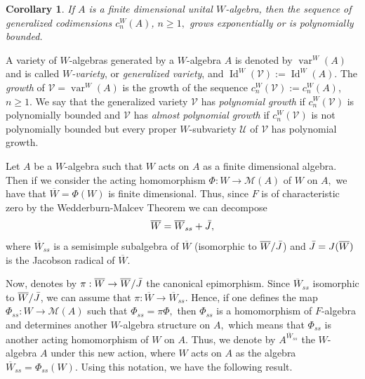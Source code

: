 \documentclass[reqno]{amsart}
\newtheorem{corollary}[theorem]{Corollary}
\theoremstyle{definition}
\numberwithin{equation}{section}
\numberwithin{theorem}{section}
\DeclareMathOperator{\V}{var}
\DeclareMathOperator{\I}{Id}
\newcommand{\M}{\mathcal{M}}
\begin{document}
\begin{corollary}
    If $A$ is a finite dimensional unital $W$-algebra, then the sequence of generalized codimensions $c^W_n(A)$, $n\geq 1,$ grows exponentially or is polynomially bounded.
\end{corollary}



    A variety of $W$-algebras generated by a $W$-algebra $A$ is denoted by $\V^W(A)$ and is called \emph{$W$-variety}, or \emph{generalized variety}, and $\I^W(\mathcal{V}):=\I^W(A)$. The \emph{growth} of $\mathcal{V}= \V^W(A)$ is the growth of the sequence $c_{n}^W(\mathcal{V}):=c_{n}^W(A)$, $n\geq 1$. We say that the generalized variety $\mathcal{V}$ has \emph{polynomial growth} if $c_{n}^W(\mathcal{V})$ is polynomially bounded and $\mathcal{V}$ has \emph{almost polynomial growth} if  $c_{n}^W(\mathcal{V})$ is not polynomially bounded but every proper $W$-subvariety $\mathcal{U}$ of $\mathcal{V}$ has polynomial growth.




   
    

\smallskip



Let $A$ be a $W$-algebra such that $W$ acts on $A$ as a finite dimensional algebra. Then if we consider the acting homomorphism $\Phi: W \to \M(A)$ of $W$ on $A,$ 
we have that $\overline{W}= \Phi(W)$ is finite dimensional. Thus, since $F$ is of characteristic zero
by the Wedderburn-Malcev Theorem we can decompose 
$$\overline{W}=\overline{W}_{ss}+\Bar{J},$$ 
where $\overline{W}_{ss}$ is a semisimple subalgebra of $\overline{W}$ (isomorphic to $\overline{W}/\Bar{J}$) and $\Bar{J}=J(\overline{W})$ is the Jacobson radical of $\overline{W}$. 



Now, denotes by $\pi:\overline{W} \rightarrow \overline{W}/\Bar{J}$ the canonical epimorphism. Since $\overline{W}_{ss}$ isomorphic to $\overline{W}/\Bar{J}$, we can assume that $\pi:\overline{W}\rightarrow \overline{W}_{ss}.$
Hence, if one defines the map $\Phi_{ss}: W \to \M(A)$ 
such that $\Phi_{ss}=\pi\Phi ,$ then $\Phi_{ss}$ is a homomorphism of $F$-algebra and determines another $W$-algebra structure on $A,$ which means that $\Phi_{ss}$ is another acting homomorphism of $W$ on $A.$ 
Thus, we denote by  $A^{\overline{W}_{ss}}$ the $W$-algebra $A$ under this new action, where $W$ acts on $A$ as the algebra $\overline{W}_{ss}=\Phi_{ss}(W).$ Using this notation, we have the following result.
\end{document}
